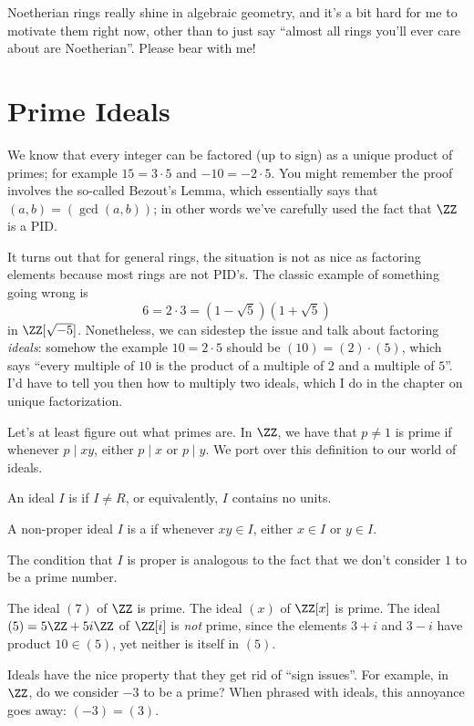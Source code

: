 Noetherian rings really shine in algebraic geometry,
and it's a bit hard for me to motivate them right now,
other than to just say ``almost all rings you'll ever care about are Noetherian''.
Please bear with me!

\section{Prime Ideals}
We know that every integer can be factored (up to sign)
as a unique product of primes; for example $15 = 3 \cdot 5$
and $-10 = -2 \cdot 5$.
You might remember the proof involves the so-called Bezout's Lemma,
which essentially says that $(a,b) = (\gcd(a,b))$;
in other words we've carefully used the fact that $\ZZ$ is a PID.

It turns out that for general rings, the situation is not as nice
as factoring elements because most rings are not PID's.
The classic example of something going wrong is
\[ 6 = 2 \cdot 3 = \left( 1-\sqrt5 \right)\left( 1+\sqrt5 \right) \]
in $\ZZ[\sqrt{-5}]$.
Nonetheless, we can sidestep the issue
and talk about factoring \emph{ideals}:
somehow the example $10 = 2 \cdot 5$ should be $(10) = (2) \cdot (5)$,
which says ``every multiple of $10$ is the product of a
multiple of $2$ and a multiple of $5$''.
I'd have to tell you then how to multiply two ideals, which I do
in the chapter on unique factorization.

Let's at least figure out what primes are.
In $\ZZ$, we have that $p \neq 1$ is prime if whenever $p \mid xy$,
either $p \mid x$ or $p \mid y$.
We port over this definition to our world of ideals.
\begin{definition}
	An ideal $I$ is  if $I \neq R$,
	or equivalently, $I$ contains no units.
\end{definition}
\begin{definition}
	A non-proper ideal $I$ is a 
	if whenever $xy \in I$, either $x \in I$ or $y \in I$.
\end{definition}
The condition that $I$ is proper is analogous to the
fact that we don't consider $1$ to be a prime number.

\begin{example}
	\listhack
	\begin{enumerate}[(a)]
		\ii The ideal $(7)$ of $\ZZ$ is prime.
		\ii The ideal $(x)$ of $\ZZ[x]$ is prime.
		\ii The ideal $(5) = 5\ZZ + 5i\ZZ$ of $\ZZ[i]$ is \emph{not} prime, since
		the elements $3+i$ and $3-i$ have product $10 \in (5)$,
		yet neither is itself in $(5)$.
	\end{enumerate}
\end{example}
\begin{remark}
	Ideals have the nice property that they get rid of ``sign issues''.
	For example, in $\ZZ$, do we consider $-3$ to be a prime?
	When phrased with ideals, this annoyance goes away: $(-3) = (3)$.
\end{remark}


